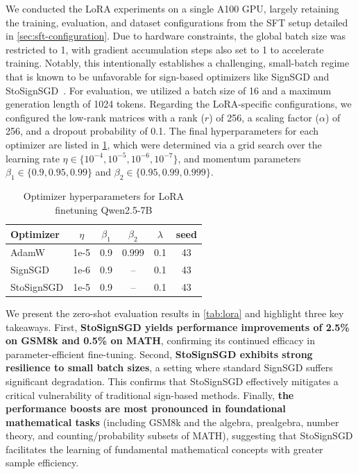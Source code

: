 \documentclass{article}
\begin{document}
We conducted the LoRA experiments on a single A100 GPU, largely retaining the training, evaluation, and dataset configurations from the SFT setup detailed in \cref{sec:sft-configuration}. Due to hardware constraints, the global batch size was restricted to 1, with gradient accumulation steps also set to 1 to accelerate training. Notably, this intentionally establishes a challenging, small-batch regime that is known to be unfavorable for sign-based optimizers like SignSGD and StoSignSGD~\citep{bernstein2018signsgd,wen2026fantastic}. For evaluation, we utilized a batch size of 16 and a maximum generation length of 1024 tokens. Regarding the LoRA-specific configurations, we configured the low-rank matrices with a rank ($r$) of 256, a scaling factor ($\alpha$) of 256, and a dropout probability of 0.1. The final hyperparameters for each optimizer are listed in \cref{tab:optimizer-hp-qwen-lora}, which were determined via a grid search over the learning rate $\eta \in \{10^{-4}, 10^{-5}, 10^{-6}, 10^{-7}\}$, and momentum parameters $\beta_1 \in \{0.9, 0.95, 0.99\}$ and $\beta_2 \in \{0.95, 0.99, 0.999\}$.

\begin{table}[htbp]
\centering
\caption{Optimizer hyperparameters for LoRA finetuning Qwen2.5-7B\label{tab:optimizer-hp-qwen-lora}}
\centering
\begin{tabular}{lccccc}
\toprule
\textbf{Optimizer} & $\eta$ & $\beta_1$ & $\beta_2$ & $\lambda$ & seed\\
\midrule
AdamW   & 1e-5 & 0.9 & 0.999 & 0.1 & 43\\
SignSGD & 1e-6 & 0.9 & -- & 0.1  & 43\\
StoSignSGD & 1e-5 & 0.9 & -- & 0.1 & 43\\
\bottomrule
\end{tabular}
\end{table}

We present the zero-shot evaluation results in \cref{tab:lora} and highlight three key takeaways. First, \textbf{StoSignSGD yields performance improvements of 2.5\% on GSM8k and 0.5\% on MATH}, confirming its continued efficacy in parameter-efficient fine-tuning. Second, \textbf{StoSignSGD exhibits strong resilience to small batch sizes}, a setting where standard SignSGD suffers significant degradation. This confirms that StoSignSGD effectively mitigates a critical vulnerability of traditional sign-based methods. Finally, \textbf{the performance boosts are most pronounced in foundational mathematical tasks} (including GSM8k and the algebra, prealgebra, number theory, and counting/probability subsets of MATH), suggesting that StoSignSGD facilitates the learning of fundamental mathematical concepts with greater sample efficiency.
\end{document}

